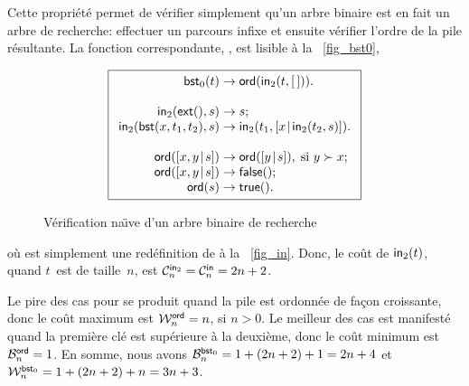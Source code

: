 Cette propriété permet de vérifier simplement qu'un arbre binaire est
en fait un arbre de recherche: effectuer un parcours infixe et ensuite
vérifier l'ordre de la pile résultante. La fonction correspondante,
, est lisible à la
\fig~\vref{fig_bst0},
\begin{figure}[t]
\begin{equation*}
\boxed{
\begin{array}{r@{\;}l@{\;}l}
\fun{bst}_0(t) & \rightarrow & \fun{ord}(\fun{in}_2(t,\el)).\\
\\
\fun{in}_2(\fun{ext}(),s) & \rightarrow & s;\\
\fun{in}_2(\fun{bst}(x,t_1,t_2),s) & \rightarrow
  & \fun{in}_2(t_1,\cons{x}{\fun{in}_2(t_2,s)}).\\
\\
\fun{ord}(\cons{x,y}{s}) & \rightarrow & \fun{ord}(\cons{y}{s}),
\;\text{si \(y \succ x\)};\\
\fun{ord}(\cons{x,y}{s}) & \rightarrow & \fun{false}();\\
\fun{ord}(s) & \rightarrow & \fun{true}().
\end{array}}
\end{equation*}
\caption{Vérification na\"{\i}ve d'un arbre binaire de recherche
\label{fig_bst0}}
\end{figure}
où  est simplement une
redéfinition de  à la
\fig~\vref{fig_in}. Donc, le coût de \(\fun{in}_2(t)\), quand
\(t\)~est de taille~\(n\), est \(\C{\fun{in}_2}{n} = \C{\fun{in}}{n} =
2n + 2\).

Le pire des cas pour  se produit
quand la pile est ordonnée de façon croissante, donc le coût maximum
est \(\W{\fun{ord}}{n} = n\), si \(n > 0\). Le meilleur des cas est
manifesté quand la première clé est supérieure à la deuxième, donc le
coût minimum est \(\B{\fun{ord}}{n} = 1\). En somme, nous avons
\(\B{\fun{bst}_0}{n} = 1 + (2n+2) + 1 = 2n + 4\) et
\(\W{\fun{bst}_0}{n} = 1 + (2n+2) + n = 3n + 3\).

